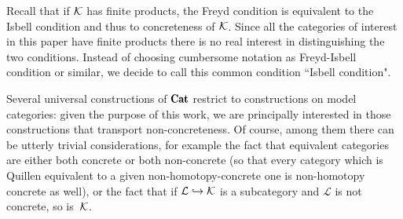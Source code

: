 \documentclass[a4paper, 10pt]{amsart}
\begin{document}
\begin{remark}
Recall that if $\mathcal{K}$ has finite products, the Freyd condition is equivalent to the Isbell condition and thus to concreteness of $\mathcal{K}$. Since all the categories of interest in this paper have finite products there is no real interest in distinguishing the two conditions. Instead of choosing cumbersome notation as Freyd-Isbell condition or similar, we decide to call this common condition ``Isbell condition".
\end{remark}

Several universal constructions of $\Cat$ restrict to constructions on model categories: given the purpose of this work, we are principally interested in those constructions that transport non-concreteness. Of course, among them there can be utterly trivial considerations, for example the fact that equivalent categories are either both concrete or both non-concrete (so that every category which is Quillen equivalent to a given non-homotopy\hyp{}concrete one is non-homotopy concrete as well), or the fact that if $\mathcal{L}\hookrightarrow \mathcal{K}$ is a subcategory and $\mathcal{L}$ is not concrete, so is~$\mathcal{K}$.
\end{document}
